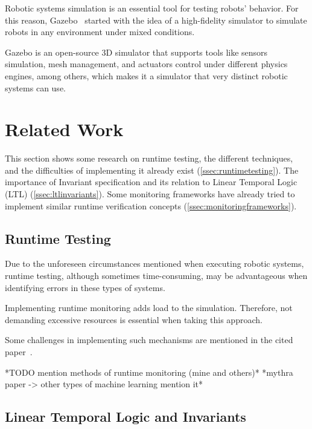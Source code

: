 Robotic systems simulation is an essential tool for testing robots' behavior. For this reason, Gazebo~\cite{koenig2004design} started with the idea of a high-fidelity simulator to simulate robots in any environment under mixed conditions.

Gazebo is an open-source 3D simulator that supports tools like sensors simulation, mesh management, and actuators control under different physics engines, among others, which makes it a simulator that very distinct robotic systems can use.


\section{Related Work}
\label{sec:relatedwork}

This section shows some research on runtime testing, the different techniques, and the difficulties of implementing it already exist (\autoref{ssec:runtimetesting}). The importance of Invariant specification and its relation to Linear Temporal Logic (LTL) (\autoref{ssec:ltlinvariants}). Some monitoring frameworks have already tried to implement similar runtime verification concepts (\autoref{ssec:monitoringframeworks}).


\subsection{Runtime Testing}
\label{ssec:runtimetesting}

Due to the unforeseen circumstances mentioned when executing robotic systems, runtime testing, although sometimes time-consuming, may be advantageous when identifying errors in these types of systems.

Implementing runtime monitoring adds load to the simulation. Therefore, not demanding excessive resources is essential when taking this approach.

Some challenges in implementing such mechanisms are mentioned in the cited paper~\cite{stadler2022towards}.

*TODO mention methods of runtime monitoring (mine and others)*
*mythra paper -> other types of machine learning mention it*


\subsection{Linear Temporal Logic and Invariants}
\label{ssec:ltlinvariants}

